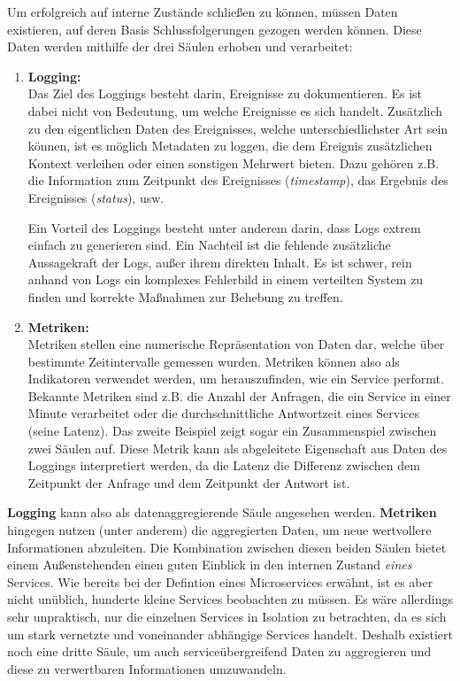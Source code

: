\begin{definition}\autocites[Chapter 4: Three Pillars of Observability]{Sridharan2018}[S. 373f]{microservice_enterprise}
	Um erfolgreich auf interne Zustände schließen zu können, müssen Daten existieren, auf deren Basis Schlussfolgerungen gezogen werden können. Diese Daten werden mithilfe der drei Säulen erhoben und verarbeitet:


	\begin{enumerate}
		\item \textbf{Logging:}\\
		Das Ziel des Loggings besteht darin, Ereignisse zu dokumentieren. Es ist dabei nicht von Bedeutung, um welche Ereignisse es sich handelt. Zusätzlich zu den eigentlichen Daten des Ereignisses, welche unterschiedlichster Art sein können, ist es möglich Metadaten zu loggen, die dem Ereignis zusätzlichen Kontext verleihen oder einen sonstigen Mehrwert bieten. Dazu gehören z.B. die Information zum Zeitpunkt des Ereignisses (\textit{timestamp}), das Ergebnis des Ereignisses (\textit{status}), usw. 
		
		Ein Vorteil des Loggings besteht unter anderem darin, dass Logs extrem einfach zu generieren sind. Ein Nachteil ist die fehlende zusätzliche Aussagekraft der Logs, außer ihrem direkten Inhalt. Es ist schwer, rein anhand von Logs ein komplexes Fehlerbild in einem verteilten System zu finden und korrekte Maßnahmen zur Behebung zu treffen.
		\item \textbf{Metriken:}\\
		Metriken stellen eine numerische Repräsentation von Daten dar, welche über bestimmte Zeitintervalle gemessen wurden. \autocite[S. 373f]{Sridharan2018} Metriken können also als Indikatoren verwendet werden, um herauszufinden, wie ein Service performt. Bekannte Metriken sind z.B. die Anzahl der Anfragen, die ein Service in einer Minute verarbeitet oder die durchschnittliche Antwortzeit eines Services (seine Latenz). Das zweite Beispiel zeigt sogar ein Zusammenspiel zwischen zwei Säulen auf. Diese Metrik kann als abgeleitete Eigenschaft aus Daten des Loggings interpretiert werden, da die Latenz die Differenz zwischen dem Zeitpunkt der Anfrage und dem Zeitpunkt der Antwort ist.
		\setcounter{pillarsCounter}{\value{enumi}}
	\end{enumerate}

	\textbf{Logging} kann also als datenaggregierende Säule angesehen werden. \textbf{Metriken} hingegen nutzen (unter anderem) die aggregierten Daten, um neue wertvollere Informationen abzuleiten. Die Kombination zwischen diesen beiden Säulen bietet einem Außenstehenden einen guten Einblick in den internen Zustand \textit{eines} Services. Wie bereits bei der Defintion eines Microservices erwähnt, ist es aber nicht unüblich, hunderte kleine Services beobachten zu müssen. Es wäre allerdings sehr unpraktisch, nur die einzelnen Services in Isolation zu betrachten, da es sich um stark vernetzte und voneinander abhängige Services handelt. Deshalb existiert noch eine dritte Säule, um auch serviceübergreifend Daten zu aggregieren und diese zu verwertbaren Informationen umzuwandeln.


\end{definition}
